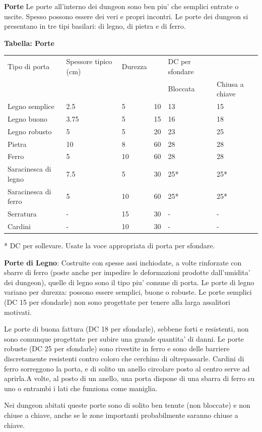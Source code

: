 \documentclass[a4paper,11pt,twoside,openany]{dndbook}
\begin{document}
{\textbf{Porte} Le porte all'interno dei dungeon sono ben piu' che semplici entrate o uscite. Spesso possono essere dei veri e propri incontri. Le porte dei dungeon si presentano in tre tipi basilari: di legno, di pietra e di ferro.

\bigskip

\textbf{Tabella: Porte}

\begin{tabular}[c]{@{}llllll@{}}
\toprule 
Tipo di porta & Spessore tipico (cm) & Durezza & & DC per sfondare & \tabularnewline
 & & & & Bloccata & Chiusa a chiave\tabularnewline
Legno semplice & 2.5 & 5 & 10 & 13 & 15\tabularnewline
Legno buono & 3.75 & 5 & 15 & 16 & 18\tabularnewline
Legno robusto & 5 & 5 & 20 & 23 & 25\tabularnewline
Pietra & 10 & 8 & 60 & 28 & 28\tabularnewline
Ferro & 5 & 10 & 60 & 28 & 28\tabularnewline
Saracinesca di legno & 7.5 & 5 & 30 & 25{*} & 25{*}\tabularnewline
Saracinesca di ferro & 5 & 10 & 60 & 25{*} & 25{*}\tabularnewline
Serratura & - & 15 & 30 & - & -\tabularnewline
Cardini & - & 10 & 30 & - & -\tabularnewline
\bottomrule
\end{tabular}

{*} DC per sollevare. Usate la voce appropriata di porta per sfondare.

\bigskip

\textbf{Porte di Legno}: Costruite con spesse assi inchiodate, a volte rinforzate con sbarre di ferro (poste anche per impedire le deformazioni prodotte dall'umidita' dei dungeon), quelle di legno sono il tipo piu' comune di porta. Le porte di legno variano per durezza: possono essere semplici, buone o robuste. Le porte semplici (DC 15 per sfondarle) non sono progettate per tenere alla larga assalitori motivati.

Le porte di buona fattura (DC 18 per sfondarle), sebbene forti e resistenti, non sono comunque progettate per subire una grande quantita' di danni. Le porte robuste (DC 25 per sfondarle) sono rivestite in ferro e sono delle barriere discretamente resistenti contro coloro che cerchino di oltrepassarle. Cardini di ferro sorreggono la porta, e di solito un anello circolare posto al centro serve ad aprirla.A volte, al posto di un anello, una porta dispone di una sbarra di ferro su uno o entrambi i lati che funziona come maniglia.

Nei dungeon abitati queste porte sono di solito ben tenute (non bloccate) e non chiuse a chiave, anche se le zone importanti probabilmente saranno chiuse a chiave.

}
\end{document}
